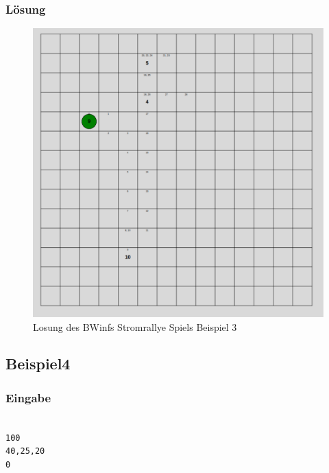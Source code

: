 \documentclass[a4paper,12pt,arial]{scrartcl}
\begin{document}
\subsubsection{Lösung}
\begin{figure}[h]
    \centering
    \includegraphics[width=\textwidth]{solution3.pdf}
    \caption{Losung des BWinfs Stromrallye Spiels Beispiel 3}
    \label{fig:loesung3}
\end{figure}

\subsection{Beispiel4}
\subsubsection{Eingabe}
\texttt{ \\
100 \\
40,25,20 \\
0 \\
}
\end{document}

